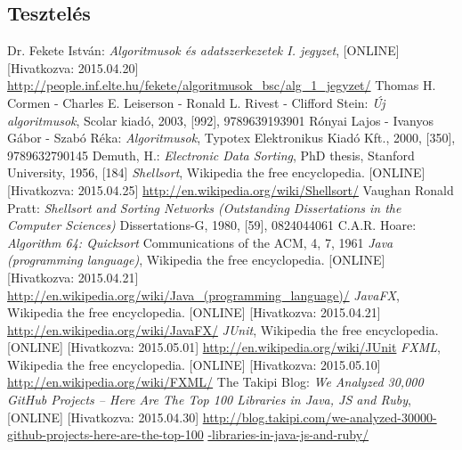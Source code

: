 \documentclass{elteikthesis}
\begin{document}
\subsection{Tesztelés}



\begin{thebibliography}{widest entry}
Dr. Fekete István:
\emph{Algoritmusok és adatszerkezetek I. jegyzet},
[ONLINE] [Hivatkozva: 2015.04.20] \url{http://people.inf.elte.hu/fekete/algoritmusok_bsc/alg_1_jegyzet/}
Thomas H. Cormen - Charles E. Leiserson - Ronald L. Rivest - Clifford Stein:
\emph{Új algoritmusok},
Scolar kiadó, 2003,
[992], 9789639193901
Rónyai Lajos - Ivanyos Gábor - Szabó Réka:
\emph{Algoritmusok},
Typotex Elektronikus Kiadó Kft., 2000,
[350], 9789632790145
Demuth, H.:
\emph{Electronic Data Sorting},
PhD thesis, Stanford University,
1956, [184]
\emph{Shellsort},
Wikipedia the free encyclopedia.
[ONLINE] [Hivatkozva: 2015.04.25]
\url{http://en.wikipedia.org/wiki/Shellsort/}
Vaughan Ronald Pratt:
\emph{Shellsort and Sorting Networks (Outstanding Dissertations in the Computer Sciences)}
Dissertations-G, 1980,
[59], 0824044061
C.A.R. Hoare:
\emph{Algorithm 64: Quicksort}
Communications of the ACM, 4, 7, 1961
\emph{Java (programming language)},
Wikipedia the free encyclopedia.
[ONLINE] [Hivatkozva: 2015.04.21]
\url{http://en.wikipedia.org/wiki/Java_(programming_language)/}
\emph{JavaFX},
Wikipedia the free encyclopedia.
[ONLINE] [Hivatkozva: 2015.04.21]
\url{http://en.wikipedia.org/wiki/JavaFX/}
\emph{JUnit},
Wikipedia the free encyclopedia.
[ONLINE] [Hivatkozva: 2015.05.01]
\url{http://en.wikipedia.org/wiki/JUnit}
\emph{FXML},
Wikipedia the free encyclopedia.
[ONLINE] [Hivatkozva: 2015.05.10]
\url{http://en.wikipedia.org/wiki/FXML/}
The Takipi Blog:
\emph{We Analyzed 30,000 GitHub Projects – Here Are The Top 100 Libraries in Java, JS and Ruby},
[ONLINE] [Hivatkozva: 2015.04.30] \url{http://blog.takipi.com/we-analyzed-30000-github-projects-here-are-the-top-100}
\url{-libraries-in-java-js-and-ruby/}
\end{thebibliography}
\end{document}
